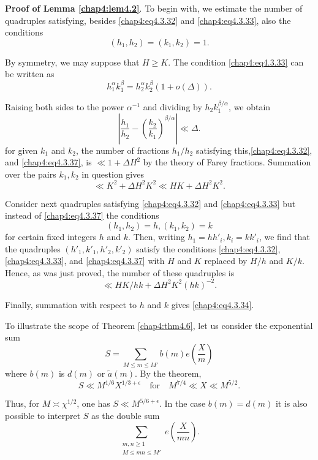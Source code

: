 {\bf Proof of Lemma \ref{chap4:lem4.2}}. To begin with, we estimate the number of quadruples satisfying, besides \eqref{chap4:eq4.3.32} and \eqref{chap4:eq4.3.33}, also the conditions 
\begin{equation}\label{chap4:eq4.3.37}
\left(h_1,h_2\right)=\left(k_1,k_2\right)=1.
\end{equation}

By symmetry, we may suppose that $H\geq K$. The condition \eqref{chap4:eq4.3.33} can be written as
$$
h_1^\alpha k_1^\beta =h_2^\alpha k_2^\beta(1+o(\Delta)).
$$

Raising both sides to the power $\alpha^{-1}$ and dividing by $h_2k_1^{\beta/\alpha}$, we obtain
$$
\left|\frac{h_1}{h_2}-\left(\frac{k_2}{k_1}\right)^{\beta/\alpha}\right|\ll\Delta.
$$\pageoriginale
for given $k_1$ and $k_2$, the number of fractions $h_1/h_2$ satisfying this,\break\eqref{chap4:eq4.3.32}, and \eqref{chap4:eq4.3.37}, is $\ll 1+\Delta H^2$ by the theory of Farey fractions. Summation over the pairs $k_1,k_2$ in question gives
$$
\ll K^2+\Delta H^2K^2\ll HK+\Delta H^2K^2.
$$

Consider next quadruples satisfying \eqref{chap4:eq4.3.32} and \eqref{chap4:eq4.3.33} but instead of \eqref{chap4:eq4.3.37} the conditions
$$
\left(h_1,h_2\right)=h,\left(k_1,k_2\right)=k
$$
for certain fixed integers $h$ and $k$. Then, writing $h_1=hh'_i,
k_i=kk'_i$, we find that the quadruples $(h'_1,k'_1,h'_2,k'_2)$
satisfy the conditions \eqref{chap4:eq4.3.32}, \eqref{chap4:eq4.3.33},
and \eqref{chap4:eq4.3.37} with $H$ and $K$ replaced by $H/h$ and
$K/k$. Hence, as was just proved, the number of these quadruples is  
$$
\ll HK/hk+\Delta H^2K^2(hk)^{-2}.
$$

Finally, summation with respect to $h$ and $k$ gives \eqref{chap4:eq4.3.34}.

\begin{example*}
To illustrate the scope of Theorem \ref{chap4:thm4.6}, let us consider
the exponential sum 
\begin{equation}\label{chap4:eq4.3.38}
S=\sum\limits_{M\leq m\leq M'}b(m)e\left(\frac{X}{m}\right)
\end{equation}
where $b(m)$ is $d(m)$ or $\tilde{a}(m)$. By the theorem,
$$
S\ll M^{1/6}X^{1/3+\epsilon}\quad\text{for}\quad M^{7/4}\ll X \ll M^{5/2}.
$$

Thus, for $M\asymp\chi^{1/2}$, one has $S\ll M^{5/6+\epsilon}$. In the case $b(m)=d(m)$ it is also possible to interpret $S$ as the double sum
$$
\sum_{\substack{m,n\geq 1\\ M\leq mn\leq M'}}e\left(\frac{X}{mn}\right).
$$\pageoriginale
\end{example*}

